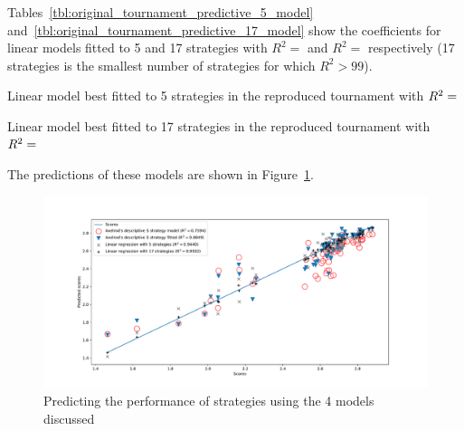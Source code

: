 \documentclass{article}
\begin{document}
Tables~\ref{tbl:original_tournament_predictive_5_model}
and~\ref{tbl:original_tournament_predictive_17_model} show the coefficients for
linear models fitted to 5 and 17 strategies with
\(R^2=\) and
\(R^2=\)
respectively (17 strategies is the smallest number of strategies for which
\(R^2>99\)).


\begin{table}[!hbtp]
        \centering
        
        \caption{Linear model best fitted to 5 strategies in the reproduced tournament
                 with
             \(R^2=\protect\)}
        \label{tbl:original_tournament_predictive_5_model}
\end{table}

\begin{table}[!hbtp]
        \centering
        
        \caption{Linear model best fitted to 17 strategies in the reproduced tournament
                 with
             \(R^2=\protect\)}
        \label{tbl:original_tournament_predictive_17_model}
\end{table}

The predictions of these models are shown in
Figure~\ref{fig:original_tournament_predictive_score_models}.

\begin{figure}[!hbtp]
    \centering
    \includegraphics[width=.9\textwidth]{assets/original_tournament_predictive_score_models.pdf}
    \caption{Predicting the performance of strategies using the 4 models
             discussed}
    \label{fig:original_tournament_predictive_score_models}
\end{figure}
\end{document}
